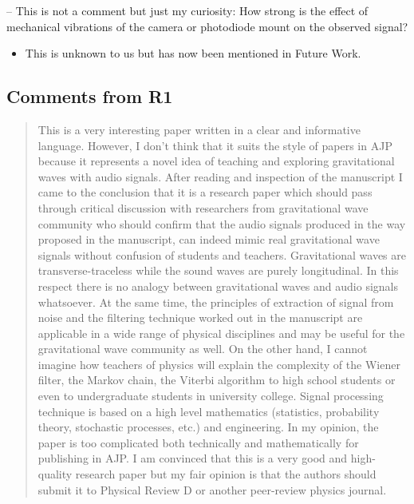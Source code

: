 \documentclass{article}
\begin{document}
\noindent
-- This is not a comment but just my curiosity: How strong is the effect of mechanical vibrations of the camera or photodiode mount on the observed signal?
\begin{itemize}
\item This is unknown to us but has now been mentioned in Future Work.
\end{itemize}



\subsection{Comments from R1}

\begin{quote}
This is a very interesting paper written in a clear and informative language. However, I don’t think that it suits the style of papers in AJP because it represents a novel idea of teaching and exploring gravitational waves with audio signals. After reading and inspection of the manuscript I came to the  conclusion  that it is a  research  paper  which should pass  through critical discussion  with researchers  from gravitational  wave  community who  should  confirm  that  the audio signals produced in the way proposed in the manuscript, can indeed mimic real gravitational wave signals without confusion of students and teachers. Gravitational waves are transverse-traceless while the sound waves are purely longitudinal. In this respect there is no analogy between gravitational waves and audio signals whatsoever. At the same time, the principles of extraction of signal from noise and the filtering technique worked out in the manuscript are applicable in a wide range of physical disciplines and may be useful for the gravitational wave community as well. On the other hand, I cannot imagine how teachers of physics will explain the complexity of the Wiener filter, the Markov chain, the Viterbi algorithm to high school students or even to undergraduate students in university college. Signal processing technique is based  on a  high  level  mathematics (statistics, probability theory, stochastic processes, etc.) and engineering. In my opinion, the paper is too complicated both technically and mathematically for publishing in AJP. I am convinced that this is a very good and high-quality research  paper but  my  fair  opinion  is  that the authors should submit  it  to  Physical Review D or another peer-review physics journal. 
\end{quote}
\end{document}

